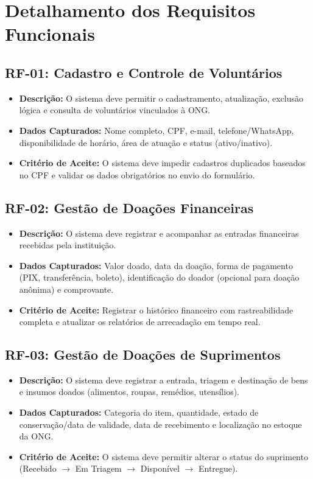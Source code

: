 \documentclass[
    12pt,               %
    a4paper,            %
    oneside,
    brazil              %
]{abntex2}
\begin{document}
\section{Detalhamento dos Requisitos Funcionais}

\subsection{RF-01: Cadastro e Controle de Voluntários}
\begin{itemize}
    \item \textbf{Descrição:} O sistema deve permitir o cadastramento, atualização, exclusão lógica e consulta de voluntários vinculados à ONG.
    \item \textbf{Dados Capturados:} Nome completo, CPF, e-mail, telefone/WhatsApp, disponibilidade de horário, área de atuação e status (ativo/inativo).
    \item \textbf{Critério de Aceite:} O sistema deve impedir cadastros duplicados baseados no CPF e validar os dados obrigatórios no envio do formulário.
\end{itemize}

\subsection{RF-02: Gestão de Doações Financeiras}
\begin{itemize}
    \item \textbf{Descrição:} O sistema deve registrar e acompanhar as entradas financeiras recebidas pela instituição.
    \item \textbf{Dados Capturados:} Valor doado, data da doação, forma de pagamento (PIX, transferência, boleto), identificação do doador (opcional para doação anônima) e comprovante.
    \item \textbf{Critério de Aceite:} Registrar o histórico financeiro com rastreabilidade completa e atualizar os relatórios de arrecadação em tempo real.
\end{itemize}

\subsection{RF-03: Gestão de Doações de Suprimentos}
\begin{itemize}
    \item \textbf{Descrição:} O sistema deve registrar a entrada, triagem e destinação de bens e insumos doados (alimentos, roupas, remédios, utensílios).
    \item \textbf{Dados Capturados:} Categoria do item, quantidade, estado de conservação/data de validade, data de recebimento e localização no estoque da ONG.
    \item \textbf{Critério de Aceite:} O sistema deve permitir alterar o status do suprimento (Recebido $\rightarrow$ Em Triagem $\rightarrow$ Disponível $\rightarrow$ Entregue).
\end{itemize}
\end{document}
